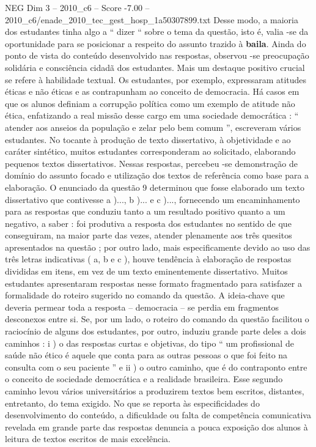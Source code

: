 \begin{textsample}{NEG Dim 3 – 2010\_c6 – Score -7.00 – 2010\_c6/enade\_2010\_tec\_gest\_hosp\_1a50307899.txt}
Desse modo, a maioria dos estudantes tinha algo a “ dizer “ sobre o tema da questão, isto é, valia -se da oportunidade para se posicionar a respeito do assunto trazido à \textbf{baila}.
Ainda do ponto de vista do conteúdo desenvolvido nas respostas, observou -se preocupação solidária e consciência cidadã dos estudantes.
Mais um destaque positivo crucial se refere à habilidade textual.
Os estudantes, por exemplo, expressaram atitudes éticas e não éticas e as contrapunham ao conceito de democracia.
Há casos em que os alunos definiam a corrupção política como um exemplo de atitude não ética, enfatizando a real missão desse cargo em uma sociedade democrática : “ atender aos anseios da população e zelar pelo bem comum ”, escreveram vários estudantes.
No tocante à produção de texto dissertativo, à objetividade e ao caráter sintético, muitos estudantes corresponderam ao solicitado, elaborando pequenos textos dissertativos.
Nessas respostas, percebeu -se demonstração de domínio do assunto focado e utilização dos textos de referência como base para a elaboração.
O enunciado da questão 9 determinou que fosse elaborado um texto dissertativo que contivesse a )..., b )... e c )..., fornecendo um encaminhamento para as respostas que conduziu tanto a um resultado positivo quanto a um negativo, a saber : foi produtiva a resposta dos estudantes no sentido de que conseguiram, na maior parte das vezes, atender plenamente aos três quesitos apresentados na questão ; por outro lado, mais especificamente devido ao uso das três letras indicativas ( a, b e c ), houve tendência à elaboração de respostas divididas em itens, em vez de um texto eminentemente dissertativo.
Muitos estudantes apresentaram respostas nesse formato fragmentado para satisfazer a formalidade do roteiro sugerido no comando da questão.
A ideia-chave que deveria permear toda a resposta – democracia – se perdia em fragmentos desconexos entre si.
Se, por um lado, o roteiro do comando da questão facilitou o raciocínio de alguns dos estudantes, por outro, induziu grande parte deles a dois caminhos : i ) o das respostas curtas e objetivas, do tipo “ um profissional de saúde não ético é aquele que conta para as outras pessoas o que foi feito na consulta com o seu paciente ” e ii ) o outro caminho, que é do contraponto entre o conceito de sociedade democrática e a realidade brasileira.
Esse segundo caminho levou vários universitários a produzirem textos bem escritos, distantes, entretanto, do tema exigido.
No que se reporta às especificidades do desenvolvimento do conteúdo, a dificuldade ou falta de competência comunicativa revelada em grande parte das respostas denuncia a pouca exposição dos alunos à leitura de textos escritos de mais excelência.

\end{textsample}
